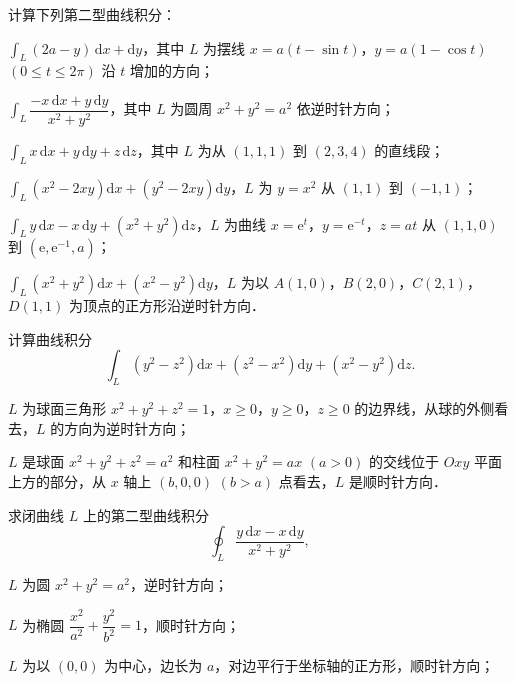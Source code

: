 \begin{xiti}
\item 计算下列第二型曲线积分：
\begin{ziti}
\item $\displaystyle\int_{L}(2a-y)\,\mathrm{d}x+\mathrm{d}y$，其中 $L$ 为摆线 $x=a(t-\sin t)$，$y=a(1-\cos t)$ $(0\leqslant t\leqslant2\pi)$ 沿 $t$ 增加的方向；
\item $\displaystyle\int_{L}\dfrac{-x\,\mathrm{d}x+y\,\mathrm{d}y}{x^{2}+y^{2}}$，其中 $L$ 为圆周 $x^{2}+y^{2}=a^{2}$ 依逆时针方向；
\item $\displaystyle\int_{L}x\,\mathrm{d}x+y\,\mathrm{d}y+z\,\mathrm{d}z$，其中 $L$ 为从 $(1,1,1)$ 到 $(2,3,4)$ 的直线段；
\item $\displaystyle\int_{L}\left(x^{2}-2xy\right)\mathrm{d}x+\left(y^{2}-2xy\right)\mathrm{d}y$，$L$ 为 $y=x^{2}$ 从 $(1,1)$ 到 $(-1,1)$；
\item $\displaystyle\int_{L}y\,\mathrm{d}x-x\,\mathrm{d}y+\left(x^{2}+y^{2}\right)\mathrm{d}z$，$L$ 为曲线 $x=\mathrm{e}^{t}$，$y=\mathrm{e}^{-t}$，$z=at$ 从 $(1,1,0)$ 到 $\left(\mathrm{e},\mathrm{e}^{-1},a\right)$；
\item $\displaystyle\int_{L}\left(x^{2}+y^{2}\right)\mathrm{d}x+\left(x^{2}-y^{2}\right)\mathrm{d}y$，$L$ 为以 $A(1,0)$，$B(2,0)$，$C(2,1)$，$D(1,1)$ 为顶点的正方形沿逆时针方向．
\end{ziti}
\item 计算曲线积分
\[
\int_{L}\left(y^{2}-z^{2}\right)\mathrm{d}x+\left(z^{2}-x^{2}\right)\mathrm{d}y+\left(x^{2}-y^{2}\right)\mathrm{d}z.
\]
\begin{ziti}
\item $L$ 为球面三角形 $x^{2}+y^{2}+z^{2}=1$，$x\geqslant0$，$y\geqslant0$，$z\geqslant0$ 的边界线，从球的外侧看去，$L$ 的方向为逆时针方向；
\item $L$ 是球面 $x^{2}+y^{2}+z^{2}=a^{2}$ 和柱面 $x^{2}+y^{2}=ax$ $(a>0)$ 的交线位于 $Oxy$ 平面上方的部分，从 $x$ 轴上 $(b,0,0)$ $(b>a)$ 点看去，$L$ 是顺时针方向．
\end{ziti}
\item 求闭曲线 $L$ 上的第二型曲线积分
\[
\oint_{L}\dfrac{y\,\mathrm{d}x-x\,\mathrm{d}y}{x^{2}+y^{2}},
\]
\begin{ziti}
\item $L$ 为圆 $x^{2}+y^{2}=a^{2}$，逆时针方向；
\item $L$ 为椭圆 $\dfrac{x^{2}}{a^{2}}+\dfrac{y^{2}}{b^{2}}=1$，顺时针方向；
\item $L$ 为以 $(0,0)$ 为中心，边长为 $a$，对边平行于坐标轴的正方形，顺时针方向；

\end{ziti}
\end{xiti}
